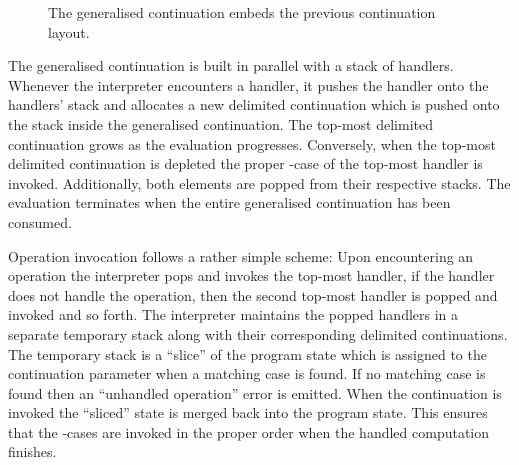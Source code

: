 \begin{figure}[H]
\begin{center}
\caption{The generalised continuation embeds the previous continuation layout.}\label{fig:continuation-notion}
\end{center}
\end{figure}

The generalised continuation is built in parallel with a stack of handlers. Whenever the interpreter encounters a handler, it pushes the handler onto the handlers' stack and allocates a new delimited continuation which is pushed onto the stack inside the generalised continuation. The top-most delimited continuation grows as the evaluation progresses. Conversely, when the top-most delimited continuation is depleted the proper -case of the top-most handler is invoked. Additionally, both elements are popped from their respective stacks. The evaluation terminates when the entire generalised continuation has been consumed.

Operation invocation follows a rather simple scheme: Upon encountering an operation the interpreter pops and invokes the top-most handler, if the handler does not handle the operation, then the second top-most handler is popped and invoked and so forth. The interpreter maintains the popped handlers in a separate temporary stack along with their corresponding delimited continuations. The temporary stack is a ``slice'' of the program state which is assigned to the continuation parameter when a matching case is found. If no matching case is found then an ``unhandled operation'' error is emitted. When the continuation is invoked the ``sliced'' state is merged back into the program state. This ensures that the -cases are invoked in the proper order when the handled computation finishes.